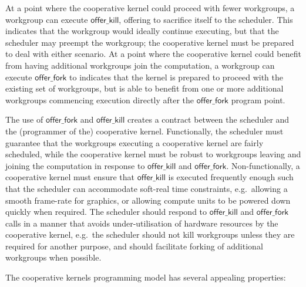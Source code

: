 \documentclass[numbers,nocopyrightspace,10pt]{sigplanconf}
\newcommand{\offerfork}{\mathsf{offer\_fork}}
\newcommand{\offerkill}{\mathsf{offer\_kill}}
\begin{document}
At a point where the cooperative kernel could proceed with fewer
workgroups, a workgroup can execute $\offerkill$, offering to
sacrifice itself to the scheduler.  This indicates that the workgroup
would ideally continue executing, but that the
scheduler may preempt the workgroup; the cooperative kernel
must be prepared to deal with either scenario.
%
At a point where the cooperative kernel could benefit from having
additional workgroups join the computation, a workgroup can execute
$\offerfork$ to indicates that the
kernel is prepared to proceed with the existing set of workgroups, but
is able to benefit from one or more additional workgroups
commencing execution directly after the $\offerfork$ program point.

The use of $\offerfork$ and $\offerkill$ creates a contract between
the scheduler and the (programmer of the) cooperative kernel.
Functionally, the
scheduler must guarantee that the workgroups executing a cooperative
kernel are fairly scheduled, while the cooperative kernel must be
robust to workgroups leaving and joining the computation in response
to $\offerkill$ and $\offerfork$.  Non-functionally, a cooperative
kernel must ensure that $\offerkill$ is executed frequently enough
such that the scheduler can accommodate soft-real time constraints,
e.g.\ allowing a smooth frame-rate for graphics, or allowing compute
units to be powered down quickly when required.  The scheduler should
respond to $\offerkill$ and $\offerfork$ calls in a manner that avoids
under-utilisation of hardware resources by the cooperative kernel,
e.g.\ the scheduler should not kill workgroups unless they are
required for another purpose, and should facilitate forking of
additional workgroups when possible.

The cooperative kernels programming model has several appealing
properties:
\end{document}
